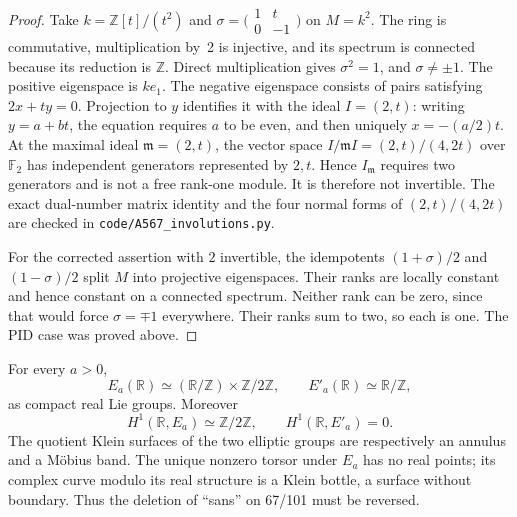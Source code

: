 \begin{proof}
Take $k=\mathbb Z[t]/(t^2)$ and
$\sigma=\bigl(\begin{smallmatrix}1&t\\0&-1\end{smallmatrix}\bigr)$
on $M=k^2$. The ring is commutative, multiplication by~2 is
injective, and its spectrum is connected because its reduction
is $\mathbb Z$. Direct multiplication gives $\sigma^2=1$,
and $\sigma\ne\pm1$. The positive eigenspace is $ke_1$.
The negative eigenspace consists of pairs satisfying
$2x+ty=0$. Projection to $y$ identifies it with the ideal
$I=(2,t)$: writing $y=a+bt$, the equation requires $a$ to be even,
and then uniquely $x=-(a/2)t$. At the maximal ideal
$\mathfrak m=(2,t)$, the vector space
$I/\mathfrak m I= (2,t)/(4,2t)$ over $\mathbb F_2$ has independent
generators represented by $2,t$. Hence $I_{\mathfrak m}$ requires
two generators and is not a free rank-one module. It is therefore
not invertible.
The exact dual-number matrix identity and the four normal forms of
$(2,t)/(4,2t)$ are checked in \texttt{code/A567\_involutions.py}.

For the corrected assertion with $2$ invertible, the idempotents
$(1+\sigma)/2$ and $(1-\sigma)/2$ split $M$ into projective
eigenspaces. Their ranks are locally constant and hence constant
on a connected spectrum. Neither rank can be zero, since that
would force $\sigma=\mp1$ everywhere. Their ranks sum to two,
so each is one. The PID case was proved above.
\end{proof}

\begin{theorem}
\label{A:real-topology}
For every $a>0$,
\[
 E_a(\mathbb R)\simeq (\mathbb R/\mathbb Z)\times\mathbb Z/2\mathbb Z,
 \qquad E'_a(\mathbb R)\simeq\mathbb R/\mathbb Z,
\]
as compact real Lie groups. Moreover
\[
 H^1(\mathbb R,E_a)\simeq\mathbb Z/2\mathbb Z,
 \qquad H^1(\mathbb R,E'_a)=0.
\]
The quotient Klein surfaces of the two elliptic groups are
respectively an annulus and a M\"obius band. The unique nonzero
torsor under $E_a$ has no real points; its complex curve modulo
its real structure is a Klein bottle, a surface without boundary.
Thus the deletion of ``sans'' on 67/101 must be reversed.
\end{theorem}

